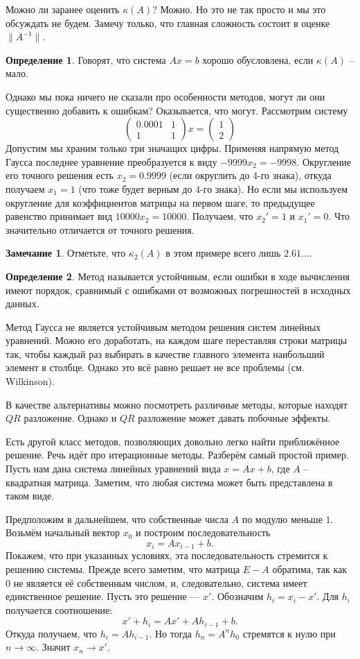 \documentclass[12pt,a4paper,oneside]{book}
\theoremstyle{definition}
\newtheorem*{rem}{\color{green!50!blue}Замечание}
\newtheorem*{defn}{\color{yellow!30!red} Определение}
\def\dfn{\begin{defn}}
\def\edfn{\end{defn}}
\def\rm{\begin{rem}}
\def\erm{\end{rem}}
\def\pmat{\begin{pmatrix}}
\def\epmat{\end{pmatrix}}
\begin{document}
Можно ли заранее оценить $\kappa(A)$? Можно. Но это не так просто и мы это обсуждать не будем. Замечу только, что главная сложность состоит в оценке $\|A^{-1}\|$.

\dfn
Говорят, что система $Ax=b$ хорошо обусловлена, если $\kappa(A)$ -- мало.
\edfn

Однако мы пока ничего не сказали про особенности методов, могут ли они существенно добавить к ошибкам? Оказывается, что могут. Рассмотрим систему 
$$\pmat 0.0001 & 1 \\ 1 & 1 \epmat x= \pmat 1 \\ 2 \epmat $$
Допустим мы храним только три значащих цифры. Применяя напрямую метод Гаусса последнее уравнение преобразуется к виду $-9999 x_2=-9998 $. Округление его точного решения есть $x_2=0.9999$ (если округлить до 4-го знака), откуда получаем $x_1=1$ (что тоже будет верным до 4-го знака). Но если мы используем округление для коэффициентов матрицы на первом шаге, то предыдущее равенство принимает вид $10000x_2 = 10000$. Получаем, что $x_2'=1$ и $x_1'=0$. Что значительно отличается от точного решения.

\rm Отметьте, что $\kappa_2(A)$ в этом примере всего лишь $2.61...$.
\erm

\dfn Метод называется устойчивым, если ошибки в ходе вычисления имеют порядок, сравнимый с ошибками от возможных погрешностей в исходных данных.
\edfn

Метод Гаусса не является устойчивым методом решения систем линейных уравнений. Можно его доработать, на каждом шаге переставляя строки матрицы так, чтобы каждый раз выбирать в качестве главного элемента  наибольший элемент в столбце. Однако это всё равно решает не все проблемы (см. Wilkinson).

В качестве альтернативы можно посмотреть различные методы, которые находят $QR$ разложение. Однако и $QR$ разложение может давать побочные эффекты.





Есть другой класс методов, позволяющих довольно легко найти приближённое решение. Речь идёт про  итерационные методы. Разберём самый простой пример. Пусть нам дана система линейных уравнений вида $x=Ax+b$, где $A$ -- квадратная матрица. Заметим, что любая система может быть представлена в таком виде. 

Предположим в дальнейшем, что собственные числа $A$ по модулю меньше $1$. Возьмём начальный вектор $x_0$ и построим последовательность
$$x_i=Ax_{i-1}+b.$$
Покажем, что при указанных условиях, эта последовательность стремится к решению системы. Прежде всего заметим, что матрица $E-A$ обратима, так как $0$ не является её собственным числом, и, следовательно, система имеет единственное решение. Пусть это решение --- $x'$. Обозначим $h_i=x_i-x'$. Для $h_i$ получается соотношение:
$$x'+h_i=Ax'+Ah_{i-1}+b.$$
Откуда получаем, что $h_i=Ah_{i-1}$. Но тогда $h_n=A^n h_0$ стремятся к нулю при $n\to \infty$. Значит $x_n\to x'$.
\end{document}
